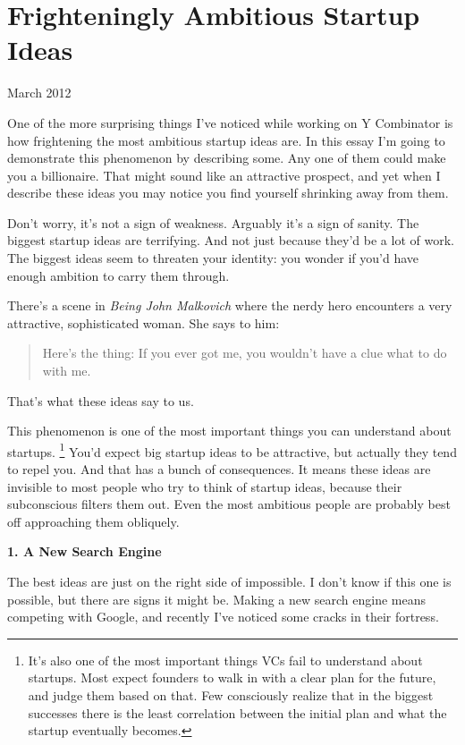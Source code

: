 \chapter{Frighteningly Ambitious Startup Ideas}

March 2012

One of the more surprising things I've noticed while working on Y
Combinator is how frightening the most ambitious startup ideas are. In
this essay I'm going to demonstrate this phenomenon by describing some.
Any one of them could make you a billionaire. That might sound like an
attractive prospect, and yet when I describe these ideas you may notice
you find yourself shrinking away from them.

Don't worry, it's not a sign of weakness. Arguably it's a sign of
sanity. The biggest startup ideas are terrifying. And not just because
they'd be a lot of work. The biggest ideas seem to threaten your
identity: you wonder if you'd have enough ambition to carry them
through.

There's a scene in \emph{Being John Malkovich} where the nerdy hero
encounters a very attractive, sophisticated woman. She says to him:

\begin{quote}
Here's the thing: If you ever got me, you wouldn't have a clue what to
do with me.
\end{quote}

That's what these ideas say to us.

This phenomenon is one of the most important things you can understand
about startups. \footnote{It's also one of the most important things VCs fail to
understand about startups. Most expect founders to walk in with a clear
plan for the future, and judge them based on that. Few consciously
realize that in the biggest successes there is the least correlation
between the initial plan and what the startup eventually becomes.} You'd expect big startup ideas
to be attractive, but actually they tend to repel you. And that has a
bunch of consequences. It means these ideas are invisible to most people
who try to think of startup ideas, because their subconscious filters
them out. Even the most ambitious people are probably best off
approaching them obliquely.

\textbf{1. A New Search Engine}

The best ideas are just on the right side of impossible. I don't know if
this one is possible, but there are signs it might be. Making a new
search engine means competing with Google, and recently I've noticed
some cracks in their fortress.


